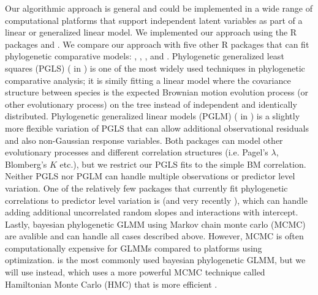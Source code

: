 \documentclass[12pt]{article}
\begin{document}
Our algorithmic approach is general and could be implemented in a wide range of computational platforms that support independent latent variables as part of a linear or generalized linear model. 
We implemented our approach using the R packages  \citep{bates2015fitting} and  \citep{brooks2017glmmTMB}.
We compare our approach with five other R packages that can fit phylogenetic comparative models:  \citep{pinheiro2014r},  \citep{ho2014phylolm},  \citep{pearse2015pez}, and  \citep{burkner2016brms}.
Phylogenetic generalized least squares (PGLS) ( in ) is one of the most widely used techniques in phylogenetic comparative analysis; it is simily fitting a linear model where the covariance structure between species is the expected Brownian motion evolution process (or other evolutionary process) on the tree instead of independent and identically distributed. 
Phylogenetic generalized linear models (PGLM) ( in ) is a slightly more flexible variation of PGLS that can allow additional observational residuals and also non-Gaussian response variables.
Both packages can model other evolutionary processes and different correlation structures (i.e. Pagel's $\lambda$, Blomberg's $K$ etc.), but we restrict our PGLS fits to the simple BM correlation. 
Neither PGLS nor PGLM can handle multiple observations or predictor level variation.
One of the relatively few packages that currently fit phylogenetic correlations to predictor level variation is  (and very recently ), which can handle adding additional uncorrelated random slopes and interactions with intercept.
Lastly, bayesian phylogenetic GLMM using Markov chain monte carlo (MCMC) are avalible and can handle all cases described above. 
However, MCMC is often computationally expensive for GLMMs compared to platforms using optimization.
 \citep{hadfield2010general} is the most commonly used bayesian phylogenetic GLMM, but we will use  instead, which uses a more powerful MCMC technique called Hamiltonian Monte Carlo (HMC) \citep{duane1987hybrid} that is more efficient \citep{li2018fitting}.

  
\end{document}
